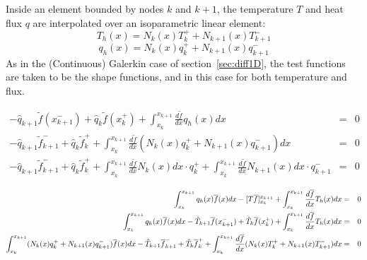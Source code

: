 Inside an element bounded by nodes $k$ and $k+1$, 
the temperature $T$ and heat flux $q$ are interpolated over an isoparametric linear element:
\[
T_h(x) = N_k(x) T_k^+ + N_{k+1}(x)T_{k+1}^-
\]
\[
q_h(x) = N_k(x) q_k^+ + N_{k+1}(x)q_{k+1}^-
\]
As in the (Continuous) Galerkin case of section~\ref{sec:diff1D}, the test functions are taken to 
be the shape functions, and in this case for both temperature and flux. 


\begin{eqnarray}
-\hat{q}_{k+1} \tilde{f}(x_{k+1}^-)
+\hat{q}_k     \tilde{f}(x_k^+)
+ \int_{x_k}^{x_{k+1}} \frac{d\tilde{f}}{dx} q_h(x) dx &=& 0 \nonumber\\
-\hat{q}_{k+1} \tilde{f}_{k+1}^-
+\hat{q}_k     \tilde{f}_k^+
+ \int_{x_k}^{x_{k+1}} \frac{d\tilde{f}}{dx} ( N_k(x) q_k^+ + N_{k+1}(x)q_{k+1}^- ) dx &=& 0 \nonumber\\
-\hat{q}_{k+1} \tilde{f}_{k+1}^-
+\hat{q}_k     \tilde{f}_k^+
+ \int_{x_k}^{x_{k+1}} \frac{d\tilde{f}}{dx} N_k(x) dx \cdot q_k^+ 
+ \int_{x_k}^{x_{k+1}} \frac{d\tilde{f}}{dx} N_{k+1}(x) dx \cdot q_{k+1}^- &=& 0
\end{eqnarray}


\begin{eqnarray}
\int_{x_k}^{x_{k+1}}  q_h(x) \overline{f}(x) dx
-[ T \overline{f}  ]_{x_k}^{x_{k+1}} + \int_{x_k}^{x_{k+1}} \frac{d\overline{f}}{dx} T_h(x) dx &=& 0 \nonumber\\
\int_{x_k}^{x_{k+1}}  q_h(x) \overline{f}(x) dx
-\hat{T}_{k+1} \overline{f}(x_{k+1}^-) 
+\hat{T}_k     \overline{f}(x_{k}^+) 
+ \int_{x_k}^{x_{k+1}} \frac{d\overline{f}}{dx} T_h(x) dx &=& 0 \nonumber\\
\int_{x_k}^{x_{k+1}} ( N_k(x) q_k^+ + N_{k+1}(x)q_{k+1}^-    ) \overline{f}(x) dx
-\hat{T}_{k+1} \overline{f}_{k+1}^-
+\hat{T}_k     \overline{f}_{k}^+
+ \int_{x_k}^{x_{k+1}} \frac{d\overline{f}}{dx} ( N_k(x) T_k^+ + N_{k+1}(x)T_{k+1}^-  ) dx &=& 0 \nonumber
\end{eqnarray}




